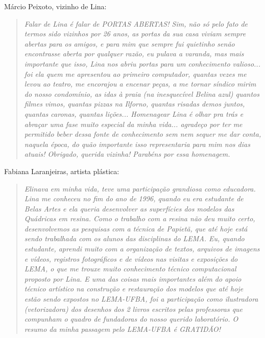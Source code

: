 \documentclass{hipatia}
\begin{document}
Márcio Peixoto, vizinho de Lina:
\begin{quote} \textit{Falar de Lina é falar de PORTAS ABERTAS! Sim, não só pelo fato de termos sido vizinhos por 26 anos, as portas da sua casa viviam sempre abertas para os amigos, e para mim que sempre fui quietinho senão encontrasse aberta por qualquer razão, eu pulava a varanda, mas mais importante que isso, Lina nos abriu portas para um conhecimento valioso... foi ela quem me apresentou ao primeiro computador, quantas vezes me levou ao teatro, me encorajou a encenar peças, a me tornar síndico mirim do nosso condomínio, as idas à praia (na inesquecível Belina azul) quantos filmes vimos, quantas pizzas na Ilforno, quantas risadas demos juntos, quantas caronas, quantas lições...
Homenagear Lina é olhar pra trás e abraçar uma fase muito especial da minha vida... agradeço por ter me permitido beber dessa fonte de conhecimento sem nem sequer me dar conta, naquela época, do quão importante isso representaria para mim nos dias atuais! Obrigado, querida vizinha! Parabéns por essa homenagem.} \end{quote}

Fabiana Laranjeiras, artista plástica:
\begin{quote} \textit{Elinava em minha vida, teve uma participação grandiosa como educadora. Lina me conheceu no fim do ano de 1996, quando eu era estudante de Belas Artes e ela queria desenvolver as superfícies dos modelos das Quádricas em resina. Como o trabalho com a resina não deu muito certo, desenvolvemos as pesquisas com a técnica de Papietã, que até hoje está sendo trabalhada com os alunos das disciplinas do LEMA.
Eu, quando estudante, aprendi muito com a organização de textos, arquivos de imagens e vídeos, registros fotográficos e de vídeos nas visitas e exposições do LEMA, o que me trouxe muito conhecimento técnico computacional proposto por Lina. E uma das coisas mais importantes além do apoio técnico artístico na construção e restauração dos modelos que até hoje estão sendo expostos no LEMA-UFBA, foi a participação como ilustradora (vetorizadora) dos desenhos dos 2 livros escritos pelas professoras que compunham o quadro de fundadoras do nosso querido laboratório.
O resumo da minha passagem pelo LEMA-UFBA é GRATIDÃO!} \end{quote}
\end{document}
